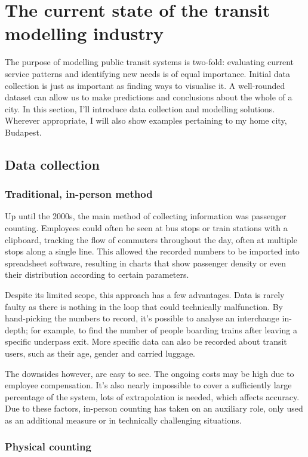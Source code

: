 \chapter{The current state of the transit modelling industry}
The purpose of modelling public transit systems is two-fold: evaluating current service patterns and identifying new needs is of equal importance. Initial data collection is just as important as finding ways to visualise it. A well-rounded dataset can allow us to make predictions and conclusions about the whole of a city. In this section, I'll introduce data collection and modelling solutions. Wherever appropriate, I will also show examples pertaining to my home city, Budapest.

\section{Data collection}
\subsection{Traditional, in-person method}

Up until the 2000s, the main method of collecting information was passenger counting. Employees could often be seen at bus stops or train stations with a clipboard, tracking the flow of commuters throughout the day, often at multiple stops along a single line. This allowed the recorded numbers to be imported into spreadsheet software, resulting in charts that show passenger density or even their distribution according to certain parameters.

Despite its limited scope, this approach has a few advantages. Data is rarely faulty as there is nothing in the loop that could technically malfunction. By hand-picking the numbers to record, it's possible to analyse an interchange in-depth; for example, to find the number of people boarding trains after leaving a specific underpass exit. More specific data can also be recorded about transit users, such as their age, gender and carried luggage.

The downsides however, are easy to see. The ongoing costs may be high due to employee compensation. It's also nearly impossible to cover a sufficiently large percentage of the system, lots of extrapolation is needed, which affects accuracy. Due to these factors, in-person counting has taken on an auxiliary role, only used as an additional measure or in technically challenging situations.

\subsection{Physical counting}

